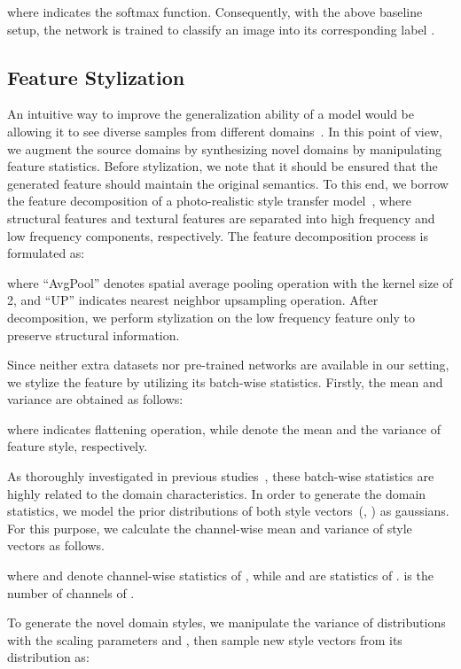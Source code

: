 \documentclass[sigconf]{acmart}
\begin{document}
where  indicates the softmax function.
Consequently, with the above baseline setup, the network  is trained to classify an image  into its corresponding label .

\subsection{Feature Stylization}

An intuitive way to improve the generalization ability of a model would be allowing it to see diverse samples from different domains~\cite{tobin2017domain}. In this point of view, we augment the source domains by synthesizing novel domains by manipulating feature statistics. Before stylization, we note that it should be ensured that the generated feature should maintain the original semantics. To this end, we borrow the feature decomposition of a photo-realistic style transfer model~\cite{Yoo2019PhotorealisticST}, where structural features and textural features are separated into high frequency and low frequency components, respectively. The feature decomposition process is formulated as:


where ``AvgPool'' denotes spatial average pooling operation with the kernel size of 2, and ``UP'' indicates nearest neighbor upsampling operation.
After decomposition, we perform stylization on the low frequency feature  only to preserve structural information.

Since neither extra datasets nor pre-trained networks are available in our setting, we stylize the feature by utilizing its batch-wise statistics. Firstly, the mean and variance are obtained as follows:

where  indicates flattening operation, while  denote the mean and the variance of feature style, respectively. 

As thoroughly investigated in previous studies~\cite{li2016adabn, pan2018two}, these batch-wise statistics are highly related to the domain characteristics. In order to generate the domain statistics, we model the prior distributions of both style vectors~(, ) as gaussians. For this purpose, we calculate the channel-wise mean and variance of style vectors as follows.

where  and  denote channel-wise statistics of , while  and  are statistics of .  is the number of channels of .

To generate the novel domain styles, we manipulate the variance of distributions with the scaling parameters  and , then sample new style vectors from its distribution as:
\end{document}
